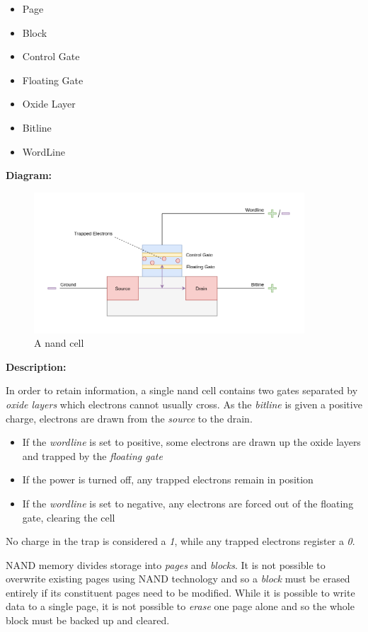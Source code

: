 \documentclass[9pt]{article}
\begin{document}
\begin{itemize}
\item Page
\item Block
\item Control Gate
\item Floating Gate
\item Oxide Layer
\item Bitline
\item WordLine
\end{itemize}

\textbf{Diagram:}

\begin{figure}[H]
\centering
\includegraphics[width=0.9\textwidth,keepaspectratio, frame]{./images/nand_flash.png}
\caption{A nand cell}
\end{figure}

\textbf{Description:}

In order to retain information, a single nand cell contains two gates separated by \emph{oxide layers} which electrons cannot usually cross. As the \emph{bitline} is given a positive charge, electrons are drawn from the \emph{source} to the drain.

\begin{itemize}
\item If the \emph{wordline} is set to positive, some electrons are drawn up the oxide layers and trapped by the \emph{floating gate}
\item If the power is turned off, any trapped electrons remain in position
\item If the \emph{wordline} is set to negative, any electrons are forced out of the floating gate, clearing the cell
\end{itemize}

No charge in the trap is considered a \emph{1}, while any trapped electrons register a \emph{0}.

NAND memory divides storage into \emph{pages} and \emph{blocks}. It is not possible to overwrite existing pages using NAND technology and so a \emph{block} must be erased entirely if its constituent pages need to be modified. While it is possible to write data to a single page, it is not possible to \emph{erase} one page alone and so the whole block must be  backed up and cleared.
\end{document}
